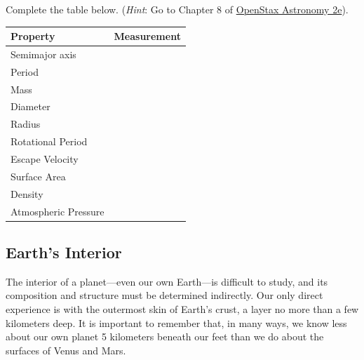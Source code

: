 \documentclass{article}
\numberwithin{equation}{section}
\numberwithin{figure}{section}
\begin{document}
\begin{exercise} \label{BKbf6Y}
    Complete the table below. (\textit{Hint}: Go to Chapter 8 of \href{https://openstax.org/books/astronomy-2e/pages/1-1-the-nature-of-astronomy}{OpenStax Astronomy 2e}).

\begin{center}
\begin{tabular}{|m{5cm}|m{5cm}|}
    \hline
    \textbf{Property} & \textbf{Measurement}\\
    \hline
    Semimajor axis &  \\
    \hline
    Period &  \\
    \hline
    Mass &  \\
    \hline
    Diameter &  \\
    \hline
    Radius & \\
    \hline
    Rotational Period & \\
    \hline
    Escape Velocity & \\
    \hline
    Surface Area & \\
    \hline
    Density & \\
    \hline
    Atmospheric Pressure & \\
    \hline
\end{tabular}
\end{center}
\end{exercise}

\clearpage

\subsection{Earth's Interior} \label{uEEpoG}

The interior of a planet---even our own Earth---is difficult to study, and its composition and structure must be determined indirectly. Our only direct experience is with the outermost skin of Earth's crust, a layer no more than a few kilometers deep. It is important to remember that, in many ways, we know less about our own planet 5 kilometers beneath our feet than we do about the surfaces of Venus and Mars.
\vspace{1em}
\end{document}
